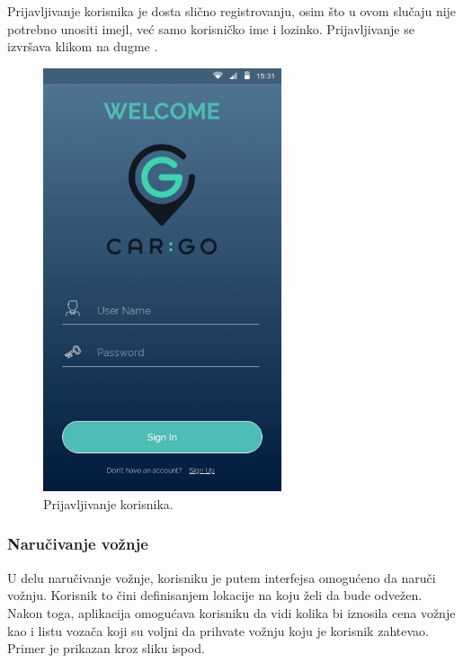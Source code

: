Prijavljivanje korisnika je dosta slično registrovanju, osim što u ovom slučaju nije potrebno unositi imejl, već samo korisničko ime i lozinko. Prijavljivanje se izvršava klikom na dugme .
\begin{figure}[H]
\begin{center}
\includegraphics[width=7cm]{Slike/Prijavljivanje.png}
\end{center}
    \caption{Prijavljivanje korisnika.}
\label{fig:Prijavljivanje korisnika}
\end{figure}

\subsubsection{\bfseries Naručivanje vožnje}

U delu naručivanje vožnje, korisniku je putem interfejsa omogućeno da naruči vožnju. Korisnik to čini definisanjem lokacije na koju želi da bude odvežen. Nakon toga, aplikacija omogućava korisniku da vidi kolika bi iznosila cena vožnje kao i listu vozača koji su voljni da prihvate vožnju koju je korisnik zahtevao. Primer je prikazan kroz sliku ispod.

